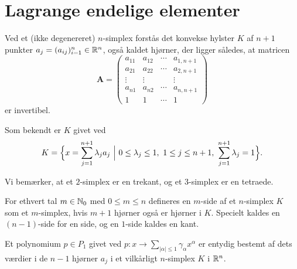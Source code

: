\section{Lagrange endelige elementer} \label{lagee}
\begin{definition}
Ved et (ikke degenereret) $n$-simplex forstås det konvekse hylster $K$ af 
$n+1$ punkter $a_j=(a_{ij})_{i=1}^n \in \mathbb{R}^n$, også kaldet hjørner,  der
ligger således, at matricen
\begin{equation} 
  {\mathbf A} =
  \left( \begin{array}{cccc}
  a_{11} & a_{12} & \cdots & a_{1,n+1} \\
  a_{21} & a_{22} & \cdots & a_{2,n+1} \\
  \vdots & \vdots &        & \vdots    \\  
  a_{n1} & a_{n2} & \cdots & a_{n,n+1} \\
  1      & 1      & \cdots & 1 
  \end{array} \right)  
\end{equation}
er invertibel.  
\end{definition}
\begin{remark}
Som bekendt er $K$ givet ved
\begin{equation}
   K=\Bigl\{ x=\sum_{j=1}^{n+1} \lambda_j a_j \ \Big| \ 0\leq \lambda_j
   \leq 1, \ 1\leq j \leq n+1, \ \sum_{j=1}^{n+1} \lambda_j =1 \Bigr\}.
\end{equation}
\end{remark}
\begin{remark}
Vi bemærker, at et $2$-simplex er en trekant, og et $3$-simplex er en 
tetraede.
\end{remark}
\begin{definition}
For ethvert tal $m\in\mathbb{N}_0$ med $0\leq m\leq n$ defineres en $m$-side af et
$n$-simplex $K$ som et $m$-simplex, hvis $m+1$ hjørner også er hjørner i $K$. 
Specielt kaldes en $(n-1)$-side for en side, og en $1$-side kaldes en kant.
\end{definition}
\begin{theorem} \label{p1}
Et polynomium $p \in P_1$ givet ved 
$p : x \rightarrow \sum_{|\alpha|\leq 1} \gamma_{\alpha} x^{\alpha}$ er 
entydig bestemt af dets værdier i de $n-1$ hjørner $a_j$ i et vilkårligt
$n$-simplex $K$ i $\mathbb{R}^n$. 
\end{theorem}
